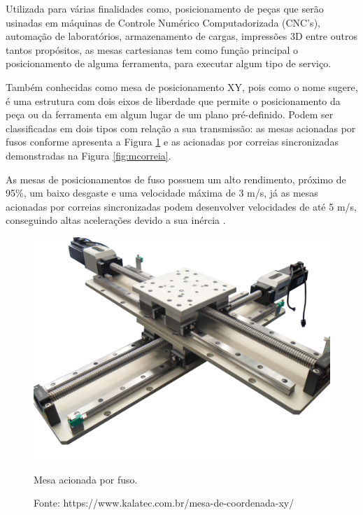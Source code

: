 Utilizada para várias finalidades como, posicionamento de peças que serão usinadas em máquinas de Controle 
Numérico Computadorizada (CNC’s), automação de laboratórios, armazenamento de cargas, impressões 3D entre 
outros tantos propósitos, as mesas cartesianas tem como função principal o posicionamento de alguma 
ferramenta, para executar algum tipo de serviço.

Também conhecidas como mesa de posicionamento XY, pois como o nome sugere, é uma estrutura com dois eixos 
de liberdade que permite o posicionamento da peça ou da ferramenta em algum lugar de um plano pré-definido. 
Podem ser classificadas em dois tipos com relação a sua transmissão:  as mesas acionadas por fusos conforme 
apresenta a Figura \ref{fig:mfuso} e as acionadas por correias sincronizadas demonstradas na Figura \ref{fig:mcorreia}.

As mesas de posicionamentos de fuso possuem um alto rendimento, próximo de 95\%, um baixo desgaste e uma 
velocidade máxima de 3 m/s, já as mesas acionadas por correias sincronizadas podem desenvolver velocidades 
de até 5 m/s, conseguindo altas acelerações  devido a sua inércia \cite{rocha2015retrofitting}.

\begin{figure}[!htb]
\centering
\includegraphics[scale = 0.3]{figuras/2-2}
\caption{Mesa acionada por fuso.}
\caption*{Fonte: https://www.kalatec.com.br/mesa-de-coordenada-xy/}
\label{fig:mfuso}
\end{figure}
    
